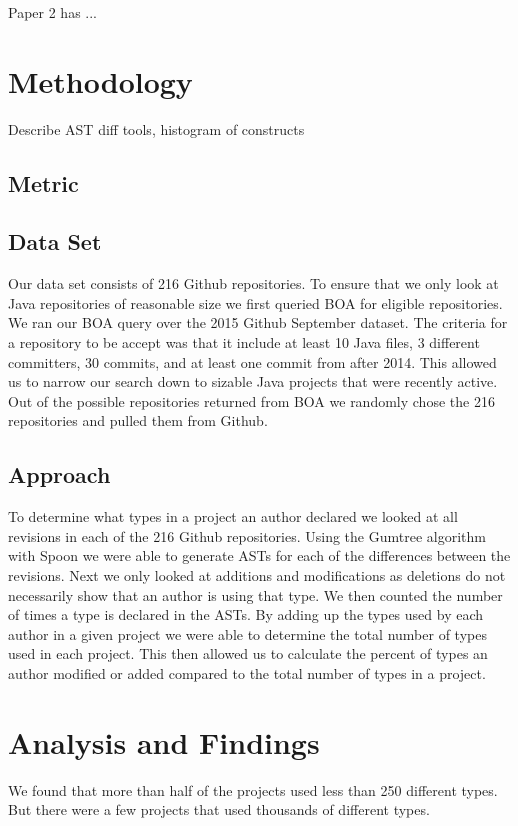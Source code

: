 \documentclass{sig-alternate-05-2015}
\begin{document}
Paper 2 has ...



\section{Methodology}
Describe AST diff tools, histogram of constructs

\subsection{Metric}

\subsection{Data Set}
Our data set consists of 216 Github repositories. To ensure that we only look at Java repositories of reasonable size we first queried BOA \cite{Dyer-Nguyen-Rajan-Nguyen-13} for eligible repositories. We ran our BOA query over the 2015 Github September dataset. The criteria for a repository to be accept was that it include at least 10 Java files, 3 different committers, 30 commits, and at least one commit from after 2014. This allowed us to narrow our search down to sizable Java projects that were recently active. Out of the possible repositories returned from BOA we randomly chose the 216 repositories and pulled them from Github.

\subsection{Approach}
To determine what types in a project an author declared we looked at all revisions in each of the 216 Github repositories. Using the Gumtree algorithm with Spoon \cite{falleri:hal-01054552} we were able to generate ASTs for each of the differences between the revisions. Next we only looked at additions and modifications as deletions do not necessarily show that an author is using that type. We then counted the number of times a type is declared in the ASTs. By adding up the types used by each author in a given project we were able to determine the total number of types used in each project. This then allowed us to calculate the percent of types an author modified or added compared to the total number of types in a project.

\section{Analysis and Findings}
We found that more than half of the projects used less than 250 different types. But there were a few projects that used thousands of different types.
\end{document}
